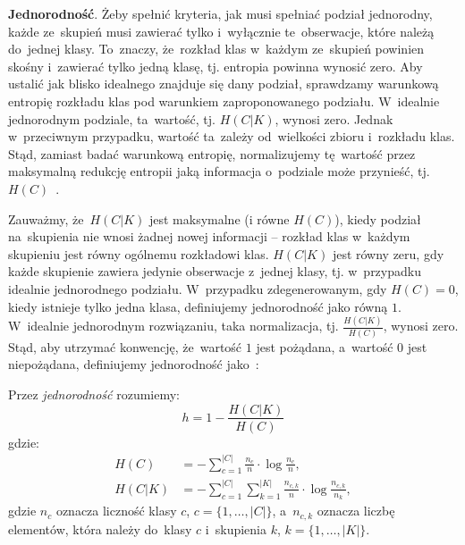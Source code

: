 \documentclass{praca1}
\begin{document}
\textbf{Jednorodność}. Żeby spełnić kryteria, jak musi spełniać podział jednorodny, każde ze~skupień musi zawierać tylko i~wyłącznie te~obserwacje, które należą do~jednej klasy. To~znaczy, że~rozkład klas w~każdym ze~skupień powinien skośny i~zawierać tylko jedną klasę, tj. entropia powinna wynosić zero. Aby ustalić jak blisko idealnego znajduje się dany podział, sprawdzamy warunkową entropię rozkładu klas pod warunkiem zaproponowanego podziału. W~idealnie jednorodnym podziale, ta~wartość, tj. $H(C|K)$, wynosi zero. Jednak w~przeciwnym przypadku, wartość ta~zależy od~wielkości zbioru i~rozkładu klas. Stąd, zamiast badać warunkową entropię, normalizujemy tę~wartość przez maksymalną redukcję entropii jaką informacja o~podziale może przynieść, tj. $H(C)$~\cite{Rosenberg2007:vmeasure}.

Zauważmy, że~$H(C|K)$ jest maksymalne (i równe $H(C)$), kiedy podział na~skupienia nie wnosi żadnej nowej informacji -- rozkład klas w~każdym skupieniu jest równy ogólnemu rozkładowi klas. $H(C|K)$ jest równy zeru, gdy każde skupienie zawiera jedynie obserwacje z~jednej klasy, tj. w~przypadku idealnie jednorodnego podziału. W~przypadku zdegenerowanym, gdy $H(C) = 0$, kiedy istnieje tylko jedna klasa, definiujemy jednorodność jako równą $1$. W~idealnie jednorodnym rozwiązaniu, taka normalizacja, tj. $\frac{H(C|K)}{H(C)}$, wynosi zero. Stąd, aby utrzymać konwencję, że~wartość $1$ jest pożądana, a~wartość $0$ jest niepożądana, definiujemy jednorodność jako~\cite{Rosenberg2007:vmeasure}:

\begin{definition}
Przez \emph{jednorodność} rozumiemy:
\begin{equation}
h = %
1 - \frac{H(C|K)}{H(C)} %
\end{equation}
gdzie:
\begin{align*}
H(C) & = - \sum\limits_{c = 1}^{|C|}\frac{n_c}{n}\cdot \log{\frac{n_c}{n}},  \\
H(C|K) & = - \sum\limits_{c = 1}^{|C|}\sum\limits_{k = 1}^{|K|}\frac{n_{c,k}}{n}\cdot \log{\frac{n_{c,k}}{n_k}},
\end{align*}
gdzie $n_c$ oznacza liczność klasy $c$, $c = \{1,\ldots, |C|\}$, a~$n_{c,k}$ oznacza liczbę elementów, która należy do~klasy $c$ i~skupienia $k$, $k = \{1,\ldots, |K|\}$.
\end{definition}
\end{document}
